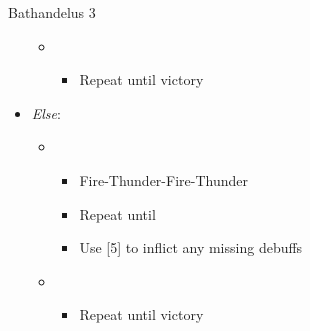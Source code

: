 \documentclass{report}
\begin{document}
\begin{battle}{Bathandelus 3}
\begin{multicols}{2}
\begin{itemize}
    \begin{itemize}
        \item \first
        \begin{itemize}
            \item Repeat until victory
        \end{itemize}
    \end{itemize}
    \item \textit{Else}:
    \begin{itemize}
        \item \sixth
            \begin{itemize}
                \item Fire-Thunder-Fire-Thunder
                \item Repeat until \stagger
                \item Use [5] to inflict any missing debuffs
            \end{itemize}
        \item \first
        \begin{itemize}
            \item Repeat until victory
        \end{itemize}
    \end{itemize}
\end{itemize}
\end{multicols}
\end{battle}
\end{document}
